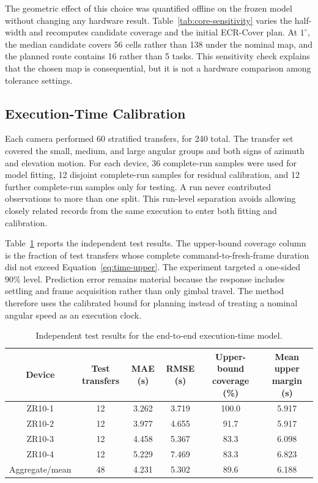 The geometric effect of this choice was quantified offline on the frozen model without changing any hardware result. Table~\ref{tab:core-sensitivity} varies the half-width and recomputes candidate coverage and the initial ECR-Cover plan. At $1^\circ$, the median candidate covers 56 cells rather than 138 under the nominal map, and the planned route contains 16 rather than 5 tasks. This sensitivity check explains that the chosen map is consequential, but it is not a hardware comparison among tolerance settings.

\subsection{Execution-Time Calibration}

Each camera performed 60 stratified transfers, for 240 total. The transfer set covered the small, medium, and large angular groups and both signs of azimuth and elevation motion. For each device, 36 complete-run samples were used for model fitting, 12 disjoint complete-run samples for residual calibration, and 12 further complete-run samples only for testing. A run never contributed observations to more than one split. This run-level separation avoids allowing closely related records from the same execution to enter both fitting and calibration.

Table~\ref{tab:time-model} reports the independent test results. The upper-bound coverage column is the fraction of test transfers whose complete command-to-fresh-frame duration did not exceed Equation~\eqref{eq:time-upper}. The experiment targeted a one-sided 90\% level. Prediction error remains material because the response includes settling and frame acquisition rather than only gimbal travel. The method therefore uses the calibrated bound for planning instead of treating a nominal angular speed as an execution clock.

\begin{table}[t]
\caption{Independent test results for the end-to-end execution-time model.}\label{tab:time-model}
\centering
\begin{tabular}{cccccc}
\toprule
Device & Test transfers & MAE (s) & RMSE (s) & Upper-bound coverage (\%) & Mean upper margin (s)\\
\midrule
ZR10-1 & 12 & 3.262 & 3.719 & 100.0 & 5.917\\
ZR10-2 & 12 & 3.977 & 4.655 & 91.7  & 5.917\\
ZR10-3 & 12 & 4.458 & 5.367 & 83.3  & 6.098\\
ZR10-4 & 12 & 5.229 & 7.469 & 83.3  & 6.823\\
\midrule
Aggregate/mean & 48 & 4.231 & 5.302 & 89.6 & 6.188\\
\bottomrule
\end{tabular}
\end{table}

